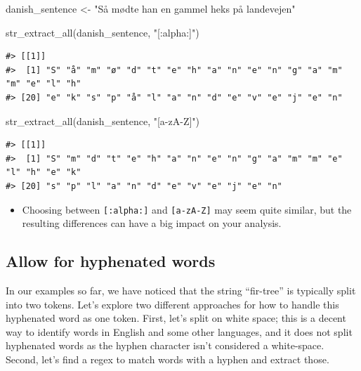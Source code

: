 \documentclass[
]{krantz}
\makeatletter
\newenvironment{Shaded}{\begin{snugshade}}{\end{snugshade}}
\newcommand{\FunctionTok}[1]{\textcolor[rgb]{0.00,0.00,0.00}{#1}}
\newcommand{\NormalTok}[1]{#1}
\newcommand{\OtherTok}[1]{\textcolor[rgb]{0.56,0.35,0.01}{#1}}
\newcommand{\StringTok}[1]{\textcolor[rgb]{0.31,0.60,0.02}{#1}}
\newenvironment{kframe}{%
\medskip{}
\setlength{\fboxsep}{.8em}
 \def\at@end@of@kframe{}%
 \ifinner\ifhmode%
  \def\at@end@of@kframe{\end{minipage}}%
  \begin{minipage}{\columnwidth}%
 \fi\fi%
 \def\FrameCommand##1{\hskip\@totalleftmargin \hskip-\fboxsep
 \colorbox{shadecolor}{##1}\hskip-\fboxsep
     \hskip-\linewidth \hskip-\@totalleftmargin \hskip\columnwidth}%
 \MakeFramed {\advance\hsize-\width
   \@totalleftmargin\z@ \linewidth\hsize
   \@setminipage}}%
 {\par\unskip\endMakeFramed%
 \at@end@of@kframe}
\renewenvironment{Shaded}{\begin{kframe}}{\end{kframe}}
\newenvironment{rmdblock}[1]
  {\begin{shaded*}
  \begin{itemize}[left = -1cm, labelsep = 1cm]
  \renewcommand{\labelitemi}{
    \raisebox{-.7\height}[0pt][0pt]{
      {\setkeys{Gin}{width=3em,keepaspectratio}\texttt{[image: images/\#1]}}
    }
  }
 
  \item
  }
  {
  \end{itemize}
  \end{shaded*}
  }
\newenvironment{rmdwarning}
  {\begin{rmdblock}{warning}}
  {\end{rmdblock}}
\makeatother
\begin{document}
\begin{Shaded}
\begin{Highlighting}[]
\NormalTok{danish\_sentence }\OtherTok{\textless{}{-}} \StringTok{"Så mødte han en gammel heks på landevejen"}

\FunctionTok{str\_extract\_all}\NormalTok{(danish\_sentence, }\StringTok{"[:alpha:]"}\NormalTok{)}
\end{Highlighting}
\end{Shaded}

\begin{verbatim}
#> [[1]]
#>  [1] "S" "å" "m" "ø" "d" "t" "e" "h" "a" "n" "e" "n" "g" "a" "m" "m" "e" "l" "h"
#> [20] "e" "k" "s" "p" "å" "l" "a" "n" "d" "e" "v" "e" "j" "e" "n"
\end{verbatim}

\begin{Shaded}
\begin{Highlighting}[]
\FunctionTok{str\_extract\_all}\NormalTok{(danish\_sentence, }\StringTok{"[a{-}zA{-}Z]"}\NormalTok{)}
\end{Highlighting}
\end{Shaded}

\begin{verbatim}
#> [[1]]
#>  [1] "S" "m" "d" "t" "e" "h" "a" "n" "e" "n" "g" "a" "m" "m" "e" "l" "h" "e" "k"
#> [20] "s" "p" "l" "a" "n" "d" "e" "v" "e" "j" "e" "n"
\end{verbatim}

\begin{rmdwarning}
Choosing between \texttt{{[}:alpha:{]}} and \texttt{{[}a-zA-Z{]}} may
seem quite similar, but the resulting differences can have a big impact
on your analysis.
\end{rmdwarning}

\hypertarget{allow-for-hyphenated-words}{%
\subsection{Allow for hyphenated words}\label{allow-for-hyphenated-words}}

In our examples so far, we have noticed that the string ``fir-tree'' is typically split into two tokens. Let's explore two different approaches for how to handle this hyphenated word as one token. First, let's split on white space; this is a decent way to identify words in English and some other languages, and it does not split hyphenated words as the hyphen character isn't considered a white-space. Second, let's find a regex to match words with a hyphen and extract those.
\end{document}
